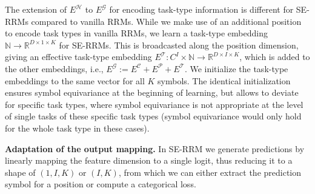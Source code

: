 \documentclass{article}
\theoremstyle{plain}
\theoremstyle{definition}
\theoremstyle{remark}
\renewcommand{\paragraph}[1]{\textbf{#1}\;}
\begin{document}
The extension of $E^{\mathcal H}$ to $E^{\mathcal G}$ for encoding task-type information is different for SE-RRMs compared to vanilla RRMs. While we make use of an additional position to encode task types in vanilla RRMs, we learn a task-type embedding $\mathbb{N} \rightarrow \mathbb{R}^{D \times 1 \times K}$ for SE-RRMs. This is broadcasted along the position dimension, giving an effective task-type embedding $E^{\mathcal T} : C^I \times \mathbb{N} \rightarrow \mathbb{R}^{D \times I \times K}$, which is added to the other embeddings, i.e., $E^{\mathcal G} := E^{\mathcal C} + E^{\mathcal P}+E^{\mathcal T}$. We initialize the task-type embeddings to the same vector for all $K$ symbols. The identical initialization ensures symbol equivariance at the beginning of learning, but allows to deviate for specific task types, where symbol equivariance is not appropriate at the level of single tasks of these specific task types (symbol equivariance would only hold for the whole task type in these cases). 

\paragraph{Adaptation of the output mapping.} In SE-RRM we generate predictions by linearly mapping 
the feature dimension to a single logit, thus 
reducing it to a shape of $(1,I,K)$ or $(I,K)$, from which we can either extract the prediction symbol for a position or compute a categorical loss.
\end{document}
